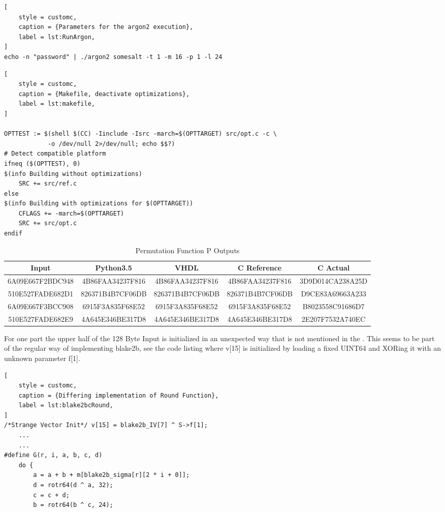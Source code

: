 \begin{lstlisting}[
	style = customc, 
	caption = {Parameters for the argon2 execution},
	label = lst:RunArgon,
]
echo -n "password" | ./argon2 somesalt -t 1 -m 16 -p 1 -l 24
\end{lstlisting}

\begin{lstlisting}[
	style = customc,
	caption = {Makefile, deactivate optimizations},
	label = lst:makefile,
]

OPTTEST := $(shell $(CC) -Iinclude -Isrc -march=$(OPTTARGET) src/opt.c -c \
			-o /dev/null 2>/dev/null; echo $$?)
# Detect compatible platform
ifneq ($(OPTTEST), 0)
$(info Building without optimizations)
	SRC += src/ref.c
else
$(info Building with optimizations for $(OPTTARGET))
	CFLAGS += -march=$(OPTTARGET)
	SRC += src/opt.c
endif
\end{lstlisting}

\begin{table}[ht]
	\centering
	\caption{Permutation Function P Outputs}
	\label{tbl:permresults}
	\begin{tabular}{c|cccc}
	\hline
	Input & Python3.5 & VHDL & C Reference & C Actual \\ 
	\hline
	 6A09E667F2BDC948 & 4B86FAA34237F816 & 4B86FAA34237F816 & 4B86FAA34237F816 & 3D9D014CA238A25D \\  
	 510E527FADE682D1 & 826371B4B7CF06DB & 826371B4B7CF06DB & 826371B4B7CF06DB & D9CE83A69663A233 \\
	 6A09E667F3BCC908 & 6915F3A835F68E52 & 6915F3A835F68E52 & 6915F3A835F68E52 & B8023558C91686D7 \\  
	 510E527FADE682E9 & 4A645E346BE317D8 & 4A645E346BE317D8 & 4A645E346BE317D8 &
	 2E207F7532A740EC \\
	 \hline
	\end{tabular}
\end{table}

For one part the upper half of the 128 Byte Input is initialized in an unexpected way that
is not mentioned in the \autocite{irtf-draft}. This seems to be part of the regular way of
implementing blake2b, see the code listing \Cref{lst:blake2bcRound} where v[15] is initialized
by loading a fixed UINT64 and XORing it with an unknown parameter f[1]. 

\begin{lstlisting}[
	style = customc,
	caption = {Differing implementation of Round Function},
	label = lst:blake2bcRound,
]
/*Strange Vector Init*/ v[15] = blake2b_IV[7] ^ S->f[1];
	...
	...
#define G(r, i, a, b, c, d)                                                   
    do {                                                                       
        a = a + b + m[blake2b_sigma[r][2 * i + 0]];                            
        d = rotr64(d ^ a, 32);                                                 
        c = c + d;                                                             
        b = rotr64(b ^ c, 24);                                                 
\end{lstlisting}


